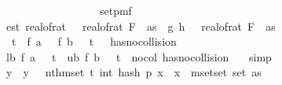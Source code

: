 \begin{isabellebody}
\ \ \ \ \ \ \isamarkupfalse%
\ {\isasymomega}\isanewline
\ \ \ \ \ \ \isamarkupfalse%
\ {\isachardoublequoteopen}{\isasymomega}\ {\isasymin}\ set{\isacharunderscore}{\kern0pt}pmf\ {\isasymOmega}\isanewline
\ \ \ \ \ \ \isamarkupfalse%
\ est{\isacharcolon}{\kern0pt}\ {\isachardoublequoteopen}real{\isacharunderscore}{\kern0pt}of{\isacharunderscore}{\kern0pt}rat\ {\isasymdelta}\ {\isacharasterisk}{\kern0pt}\ real{\isacharunderscore}{\kern0pt}of{\isacharunderscore}{\kern0pt}rat\ {\isacharparenleft}{\kern0pt}F\ {}\ as{\isacharparenright}{\kern0pt}\ {\isacharless}{\kern0pt}\ {\isasymbar}g{\isacharprime}{\kern0pt}\ {\isacharparenleft}{\kern0pt}h\ {\isasymomega}{\isacharparenright}{\kern0pt}\ {\isacharminus}{\kern0pt}\ real{\isacharunderscore}{\kern0pt}of{\isacharunderscore}{\kern0pt}rat\ {\isacharparenleft}{\kern0pt}F\ {}\ as{\isacharparenright}{\kern0pt}{\isasymbar}{\isachardoublequoteclose}\isanewline
\ \ \ \ \ \ \isamarkupfalse%
\ {\isachardoublequoteopen}{\isasymnot}{\isacharparenleft}{\kern0pt}\ t\ {\isasymle}\ f\ a\ {\isasymomega}\ {\isasymor}\ f\ b\ {\isasymomega}\ {\isacharless}{\kern0pt}\ t\ {\isasymor}\ {\isasymnot}\ has{\isacharunderscore}{\kern0pt}no{\isacharunderscore}{\kern0pt}collision\ {\isasymomega}{\isacharparenright}{\kern0pt}{\isachardoublequoteclose}\isanewline
\ \ \ \ \ \ \isamarkupfalse%
\ lb{\isacharcolon}{\kern0pt}\ {\isachardoublequoteopen}f\ a\ {\isasymomega}\ {\isacharless}{\kern0pt}\ t{\isachardoublequoteclose}\ \ ub{\isacharcolon}{\kern0pt}\ {\isachardoublequoteopen}f\ b\ {\isasymomega}\ {\isasymge}\ t{\isachardoublequoteclose}\ \ no{\isacharunderscore}{\kern0pt}col{\isacharcolon}{\kern0pt}\ {\isachardoublequoteopen}has{\isacharunderscore}{\kern0pt}no{\isacharunderscore}{\kern0pt}collision\ {\isasymomega}{\isachardoublequoteclose}\ \isamarkupfalse%
\ simp{\isacharplus}{\kern0pt}\isanewline
\isanewline
\ \ \ \ \ \ \isamarkupfalse%
\ y\ \ {\isachardoublequoteopen}y\ {\isacharequal}{\kern0pt}\ \ nth{\isacharunderscore}{\kern0pt}mset\ {\isacharparenleft}{\kern0pt}t{\isacharminus}{\kern0pt}{}{\isacharparenright}{\kern0pt}\ {\isacharbraceleft}{\kern0pt}{\isacharhash}{\kern0pt}int\ {\isacharparenleft}{\kern0pt}hash\ p\ x\ {\isasymomega}{\isacharparenright}{\kern0pt}{\isachardot}{\kern0pt}\ x\ {\isasymin}{\isacharhash}{\kern0pt}\ mset{\isacharunderscore}{\kern0pt}set\ {\isacharparenleft}{\kern0pt}set\ as{\isacharparenright}{\kern0pt}{\isacharhash}{\kern0pt}{\isacharbraceright}{\kern0pt}{\isachardoublequoteclose}\isanewline

\end{isabellebody}
